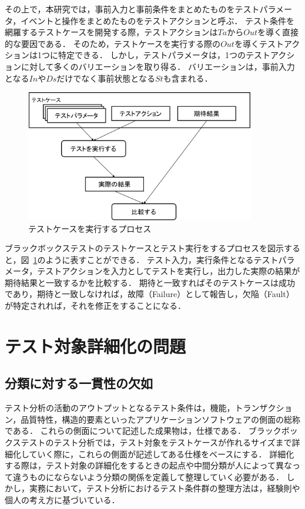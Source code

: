 その上で，本研究では，事前入力と事前条件をまとめたものをテストパラメータ，イベントと操作をまとめたものをテストアクションと呼ぶ\cite{yumoto2013-a}．
テスト条件を網羅するテストケースを開発する際，テストアクションは$Ta$から$Out$を導く直接的な要因である．
そのため，テストケースを実行する際の$Out$を導くテストアクションは1つに特定できる．
しかし，テストパラメータは，1つのテストアクションに対して多くのバリエーションを取り得る．
バリエーションは，事前入力となる$In$や$Ds$だけでなく事前状態となる$St$も含まれる．

\begin{figure}[h]
  \begin{center}
  \includegraphics[width=10cm]{./image/D-2-FigTCS.png}
  \caption{テストケースを実行するプロセス}
  \label{fig:D-4-FigTCS}
  \end{center}
\end{figure}

ブラックボックステストのテストケースとテスト実行をするプロセスを図示すると，図~\ref{fig:D-4-FigTCS}のように表すことができる．
テスト入力，実行条件となるテストパラメータ，テストアクションを入力としてテストを実行し，出力した実際の結果が期待結果と一致するかを比較する．
期待と一致すればそのテストケースは成功であり，期待と一致しなければ，故障（Failure）として報告し，欠陥（Fault）が特定されれば，それを修正をすることになる．




\newpage
\section{テスト対象詳細化の問題} \label{sec:2-2}
\subsection{分類に対する一貫性の欠如}
テスト分析の活動のアウトプットとなるテスト条件は，機能，トランザクション，品質特性，構造的要素といったアプリケーションソフトウェアの側面の総称である\cite{ISTQB}．
これらの側面について記述した成果物は，仕様である．
ブラックボックステストのテスト分析では，テスト対象をテストケースが作れるサイズまで詳細化していく際に，これらの側面が記述してある仕様をベースにする．
詳細化する際は，テスト対象の詳細化をするときの起点や中間分類が人によって異なって違うものにならないよう分類の関係を定義して整理していく必要がある．
しかし，実務において，テスト分析におけるテスト条件群の整理方法は，経験則や個人の考え方に基づいている．

